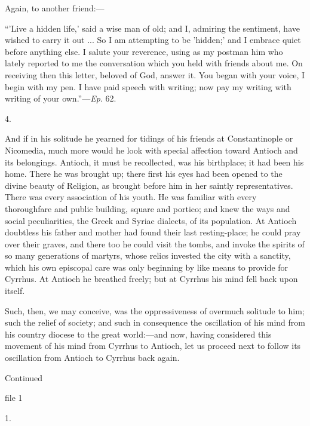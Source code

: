 Again, to another friend:—

``'Live a hidden life,' said a wise man of old; and I, admiring
the sentiment, have wished to carry it out ... So I am attempting to
be 'hidden;' and I embrace quiet before anything else. I salute your
reverence, using as my postman him who lately reported to me the
conversation which you held with friends about me.
On receiving then this letter, beloved of God, answer it. You began
with your voice, I begin with my pen. I have paid speech with writing;
now pay my writing with writing of your own.''—\emph{Ep}. 62.

4.

And if in his solitude he yearned for tidings of his friends at
Constantinople or Nicomedia, much more would he look with special
affection toward Antioch and its belongings. Antioch, it must be
recollected, was his birthplace; it had been his home. There he was
brought up; there first his eyes had been opened to the divine beauty
of Religion, as brought before him in her saintly representatives.
There was every association of his youth. He was familiar with every
thoroughfare and public building, square and portico; and knew the
ways and social peculiarities, the Greek and Syriac dialects, of its
population. At Antioch doubtless his father and mother had found their
last resting-place; he could pray over their graves, and there too he
could visit the tombs, and invoke the spirits of so many generations
of martyrs, whose relics invested the city with a sanctity, which his
own episcopal care was only beginning by like means to provide for
Cyrrhus. At Antioch he breathed freely; but at Cyrrhus his mind fell
back upon itself.

Such, then, we may conceive, was the oppressiveness of overmuch
solitude to him; such the relief of society; and such in consequence
the oscillation of his mind from his country diocese to the great
world:—and now, having considered this movement of his mind from
Cyrrhus to Antioch, let us proceed next to follow its oscillation from
Antioch to Cyrrhus back again.

Continued

file 1


1.


